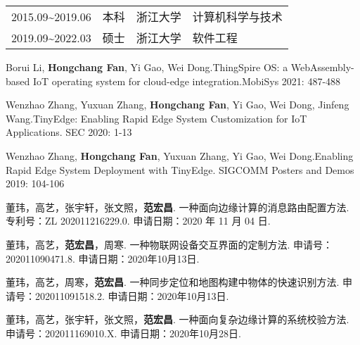 \cleardoublepage
{}
	\begin{tabular}{llll}  
		2015.09\textasciitilde2019.06 & 本科 & 浙江大学 & 计算机科学与技术  \\ 
		2019.09\textasciitilde2022.03 & 硕士 & 浙江大学 & 软件工程  \\ 
	\end{tabular}  
\begin{enumerate}[label={[\arabic*]}]
    \item Borui Li, \textbf{Hongchang Fan}, Yi Gao, Wei Dong.ThingSpire OS: a WebAssembly-based IoT operating system for cloud-edge integration.MobiSys 2021: 487-488
    \item Wenzhao Zhang, Yuxuan Zhang, \textbf{Hongchang Fan}, Yi Gao, Wei Dong, Jinfeng Wang.TinyEdge: Enabling Rapid Edge System Customization for IoT Applications. SEC 2020: 1-13
    \item Wenzhao Zhang, \textbf{Hongchang Fan}, Yuxuan Zhang, Yi Gao, Wei Dong.Enabling Rapid Edge System Deployment with TinyEdge. SIGCOMM Posters and Demos 2019: 104-106
\end{enumerate}
\begin{enumerate}[label={[\arabic*]}]
    \item 董玮，高艺，张宇轩，张文照，\textbf{范宏昌}. 一种面向边缘计算的消息路由配置方法. 专利号：ZL 202011216229.0. 申请日期：2020 年 11 月 04 日.
\end{enumerate}
\begin{enumerate}[label={[\arabic*]}]
    \item 董玮，高艺，\textbf{范宏昌}，周寒. 一种物联网设备交互界面的定制方法. 申请号：202011090471.8. 申请日期：2020年10月13日.
    \item 董玮，高艺，周寒，\textbf{范宏昌}. 一种同步定位和地图构建中物体的快速识别方法. 申请号：202011091518.2. 申请日期：2020年10月13日.
    \item 董玮，高艺，张宇轩，张文照，\textbf{范宏昌}. 一种面向复杂边缘计算的系统校验方法. 申请号：202011169010.X. 申请日期：2020年10月28日.
\end{enumerate}

